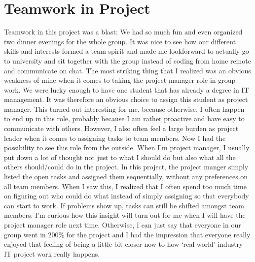 \documentclass[a4paper,11pt,twoside]{article}
\begin{document}
\section{Teamwork in Project}
Teamwork in this project was a blast: We had so much fun and even organized two dinner evenings for the whole group. It was nice to see how our different skills and interests formed a team spirit and made me lookforward to actually go to university and sit together with the group instead of coding from home remote and communicate on chat.
The most striking thing that I realized was an obvious weakness of mine when it comes to taking the project manager role in group work. We were lucky enough to have one student that has already a degree in IT management. It was therefore an obvious choice to assign this student as project manager. This turned out interesting for me, because otherwise, I often happen to end up in this role, probably because I am rather proactive and have easy to communicate with others. However, I also often feel a large burden as project leader when it comes to assigning tasks to team members. Now I had the possibility to see this role from the outside. When I'm project  manager, I usually put down a lot of thought not just to what I should do but also what all the others should/could do in the project. In this project, the project manger simply listed the open tasks and assigned them sequentially, without any preferences on all team members. When I saw this, I realized that I often spend too much time on figuring out who could do what instead of simply assigning so that everybody can start to work. If problems show up, tasks can still be shifted amongst team members. I'm curious how this insight will turn out for me when I will have the project manager role next time.
Otherwise, I can just say that everyone in our group went in 200\% for the project and I had the impression that everyone really enjoyed that feeling of being a little bit closer now to how `real-world' industry IT project work really happens.  
\end{document}
